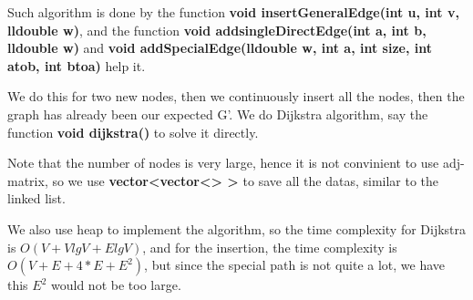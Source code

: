 Such algorithm is done by the function \textbf{void insertGeneralEdge(int u, int v, lldouble w)}, and the function \textbf{void addsingleDirectEdge(int a, int b, lldouble w)} and \textbf{void addSpecialEdge(lldouble w, int a, int size, int atob, int btoa)} help it.

We do this for two new nodes, then we continuously insert all the nodes, then the graph has already been our expected G'. We do Dijkstra algorithm, say the function \textbf{void dijkstra()} to solve it directly.

Note that the number of nodes is very large, hence it is not convinient to use adj-matrix, so we use \textbf{vector<vector<> >} to save all the datas, similar to the linked list.

We also use heap to implement the algorithm, so the time complexity for Dijkstra is $O(V+VlgV+ElgV)$, and for the insertion, the time complexity is $O(V+E+4*E+E^2)$, but since the special path is not quite a lot, we have this $E^2$ would not be too large.



